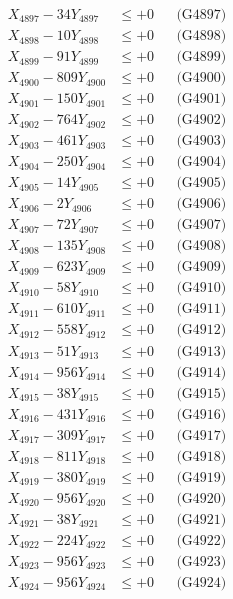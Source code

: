 \documentclass[a4paper,10pt]{article}
\begin{document}
{\begin{align}
X_{4897} - 34Y_{4897} &\leq +0 && \text{(G4897)} \\
X_{4898} - 10Y_{4898} &\leq +0 && \text{(G4898)} \\
X_{4899} - 91Y_{4899} &\leq +0 && \text{(G4899)} \\
X_{4900} - 809Y_{4900} &\leq +0 && \text{(G4900)} \\
\allowbreak
X_{4901} - 150Y_{4901} &\leq +0 && \text{(G4901)} \\
X_{4902} - 764Y_{4902} &\leq +0 && \text{(G4902)} \\
X_{4903} - 461Y_{4903} &\leq +0 && \text{(G4903)} \\
X_{4904} - 250Y_{4904} &\leq +0 && \text{(G4904)} \\
X_{4905} - 14Y_{4905} &\leq +0 && \text{(G4905)} \\
X_{4906} - 2Y_{4906} &\leq +0 && \text{(G4906)} \\
X_{4907} - 72Y_{4907} &\leq +0 && \text{(G4907)} \\
X_{4908} - 135Y_{4908} &\leq +0 && \text{(G4908)} \\
X_{4909} - 623Y_{4909} &\leq +0 && \text{(G4909)} \\
X_{4910} - 58Y_{4910} &\leq +0 && \text{(G4910)} \\
\allowbreak
X_{4911} - 610Y_{4911} &\leq +0 && \text{(G4911)} \\
X_{4912} - 558Y_{4912} &\leq +0 && \text{(G4912)} \\
X_{4913} - 51Y_{4913} &\leq +0 && \text{(G4913)} \\
X_{4914} - 956Y_{4914} &\leq +0 && \text{(G4914)} \\
X_{4915} - 38Y_{4915} &\leq +0 && \text{(G4915)} \\
X_{4916} - 431Y_{4916} &\leq +0 && \text{(G4916)} \\
X_{4917} - 309Y_{4917} &\leq +0 && \text{(G4917)} \\
X_{4918} - 811Y_{4918} &\leq +0 && \text{(G4918)} \\
X_{4919} - 380Y_{4919} &\leq +0 && \text{(G4919)} \\
X_{4920} - 956Y_{4920} &\leq +0 && \text{(G4920)} \\
\allowbreak
X_{4921} - 38Y_{4921} &\leq +0 && \text{(G4921)} \\
X_{4922} - 224Y_{4922} &\leq +0 && \text{(G4922)} \\
X_{4923} - 956Y_{4923} &\leq +0 && \text{(G4923)} \\
X_{4924} - 956Y_{4924} &\leq +0 && \text{(G4924)} \\

\end{align}}
\end{document}
